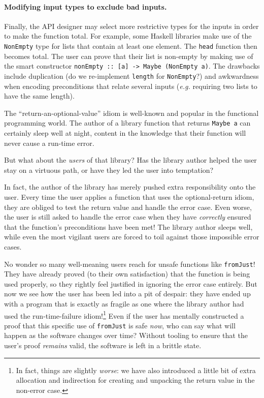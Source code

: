 \documentclass[format=sigplan, review=false, screen=true, 10pt]{acmart}
\makeatletter
\let\origsubsection\subsection
\renewcommand\subsection{\@ifstar{\starsubsection}{\nostarsubsection}}
\newcommand\nostarsubsection[1]
{\subsectionprelude\origsubsection{#1}\subsectionpostlude}
\newcommand\starsubsection[1]
{\subsectionprelude\origsubsection*{#1}\subsectionpostlude}
\newcommand\subsectionprelude{%
  \vspace{-0.25em}
}
\newcommand\subsectionpostlude{%
  \vspace{-0.05em}
}
\makeatother
\begin{document}
\paragraph{Modifying input types to exclude bad inputs.}
Finally, the API designer may select more restrictive types for the inputs in order
to make the function total. For example, some Haskell libraries make use of the
\texttt{NonEmpty} type for lists that contain at least one element. The \texttt{head}
function then becomes total. The user 
can prove that their list is non-empty by making use of the smart constructor
\texttt{nonEmpty :: [a] -> Maybe (NonEmpty a)}.
The drawbacks include duplication
(do we re-implement \texttt{length} for \texttt{NonEmpty}?)
and awkwardness when encoding preconditions that relate
several inputs (\textit{e.g.} requiring two lists to have the same length).

\subsection{Leading the user into temptation}
The ``return-an-optional-value'' idiom is well-known and popular in the functional
programming world. The author of a library function that returns \texttt{Maybe a}
can certainly sleep well at night, content in the knowledge that their function
will never cause a run-time error.

But what about the \emph{users} of that library? Has the library author helped the user stay
on a virtuous path, or have they led the user into temptation?

In fact, the author of the library has merely pushed extra responsibility onto the user.
Every time the user applies a function that uses the optional-return idiom, they are obliged
to test the return value and handle the error case. Even worse, the user is still asked
to handle the error case when they have \emph{correctly} ensured that the function's
preconditions have been met! The library author sleeps well, while even the most vigilant
users are forced to toil against those impossible error cases.

No wonder so many well-meaning users reach for unsafe functions like \texttt{fromJust}!
They have already proved (to their own satisfaction) that the function is being used properly, so they rightly
feel justified in ignoring the error case entirely. But now we see how the user has been led into
a pit of despair: they have ended up with a program that is exactly as fragile as one where the library
author had used the run-time-failure idiom!\footnote{In fact, things are slightly \emph{worse}: we have also introduced a little
bit of extra allocation and indirection for creating and unpacking the return value in the non-error case.}
Even if the user has mentally constructed a proof that this specific use of \texttt{fromJust} is safe \emph{now},
who can say what will
happen as the software changes over time? Without tooling to ensure that the user's proof \emph{remains} valid,
the software is left in a brittle state.
\end{document}
